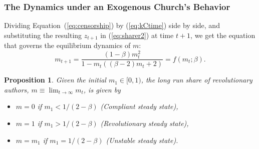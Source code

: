 \documentclass[usepdftitle=false,aspectratio=169,xcolor=dvipsnames]{beamer}
\newtheorem{proposition}{Proposition}
\begin{document}
	\begin{frame}
\frametitle{The Dynamics under an Exogenous Church's Behavior}

Dividing Equation~(\ref{eq:censorship}) by (\ref{eq:kCtime}) side by side, and substituting the resulting $z_{t+1}$ in (\ref{eq:sharer2}) at time $t+1$, we get the equation that governs the equilibrium dynamics of $m$:
\begin{equation}
m_{t+1}=\frac{(1-\beta) m_t^2}{1-m_t ((\beta -2) m_t+2)}=f(m_t;\beta)\label{eq:lawm}.
\end{equation}


\begin{proposition}
	Given the initial $m_1\in[0,1)$, the long run share of revolutionary authors, $m\equiv\lim_{t\to\infty}m_t$, is given by
	\begin{itemize}
    \item[i)]$m=0$ if $m_1<1/(2-\beta)$ (Compliant steady state),
    \item[ii)] $m=1$ if $m_1>1/(2-\beta)$ (Revolutionary steady state),
     \item[iii)]$m=m_1$ if $m_1=1/(2-\beta)$ (Unstable steady state).
	\end{itemize}
	 \label{proposition:dynex}
\end{proposition}


\end{frame}
\end{document}

